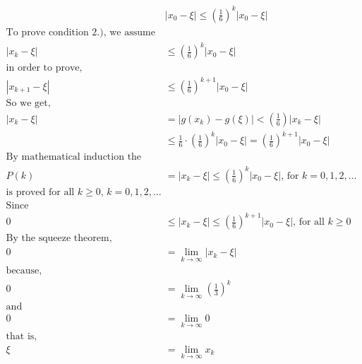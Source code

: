 \documentclass{article}
\begin{document}
\begin{align*}
     &|x_0-\xi| \le \left(\frac{1}{6} \right)^k|x_0-\xi|\\
     \text{To prove condition 2.), we assume that,}&\\
     |x_{k}-\xi|&\le \left(\frac{1}{6} \right)^{k}|x_0-\xi|\\
     \text{in order to prove,}\\
     |x_{k+1}-\xi|&\le \left(\frac{1}{6} \right)^{k+1}|x_0-\xi|\\
     \text{So we get,}&\\
     |x_{k}-\xi|&=|g(x_k)-g(\xi)| < \left(\frac{1}{6} \right)|x_k-\xi|\\
     & \le \frac{1}{6}\cdot \left(\frac{1}{6} \right)^k|x_0-\xi|= \left(\frac{1}{6} \right)^{k+1}|x_0-\xi|\\
     \text{By mathematical induction the conjecture}&\\
     P(k) &= |x_k-\xi| \le \left(\frac{1}{6} \right)^k|x_0-\xi| \text{, for }k=0,1,2,\dots\\
     \text{is proved for all $k \ge 0$, }k=0,1,2,\dots &\\
     \text{Since}&\\
     0 & \le |x_k-\xi| \le \left(\frac{1}{6} \right)^{k+1}|x_0-\xi| \text{, for all }k \ge 0\\
     \text{By the squeeze theorem,}&\\
     0&= \lim_{k \to \infty} |x_k - \xi|\\
     \text{because,}\\
     0& =\lim_{k \to \infty} \left(\frac{1}{3} \right)^k\\
     \text{and}&\\
     0& =\lim_{k \to \infty}0\\
     \text{that is,}\\
     \xi &= \lim_{k \to \infty}x_k\\
\end{align*}

\end{document}
